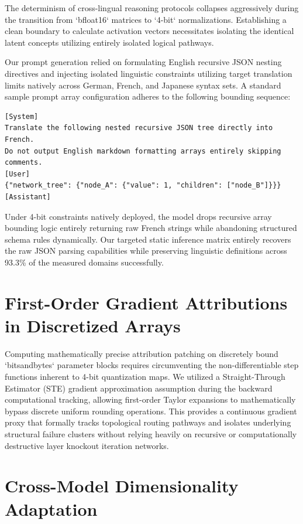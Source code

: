 \documentclass{article}
\begin{document}
The determinism of cross-lingual reasoning protocols collapses aggressively during the transition from `bfloat16` matrices to `4-bit` normalizations. Establishing a clean boundary to calculate activation vectors necessitates isolating the identical latent concepts utilizing entirely isolated logical pathways. 

Our prompt generation relied on formulating English recursive JSON nesting directives and injecting isolated linguistic constraints utilizing target translation limits natively across German, French, and Japanese syntax sets. A standard sample prompt array configuration adheres to the following bounding sequence:

\begin{verbatim}
[System]
Translate the following nested recursive JSON tree directly into French. 
Do not output English markdown formatting arrays entirely skipping comments.
[User]
{"network_tree": {"node_A": {"value": 1, "children": ["node_B"]}}}
[Assistant]
\end{verbatim}

Under 4-bit constraints natively deployed, the model drops recursive array bounding logic entirely returning raw French strings while abandoning structured schema rules dynamically. Our targeted static inference matrix entirely recovers the raw JSON parsing capabilities while preserving linguistic definitions across 93.3\% of the measured domains successfully.

\section{First-Order Gradient Attributions in Discretized Arrays}
\label{appendix:gradients}

Computing mathematically precise attribution patching on discretely bound `bitsandbytes` parameter blocks requires circumventing the non-differentiable step functions inherent to 4-bit quantization maps. We utilized a Straight-Through Estimator (STE) gradient approximation assumption during the backward computational tracking, allowing first-order Taylor expansions to mathematically bypass discrete uniform rounding operations. This provides a continuous gradient proxy that formally tracks topological routing pathways and isolates underlying structural failure clusters without relying heavily on recursive or computationally destructive layer knockout iteration networks.

\section{Cross-Model Dimensionality Adaptation}
\label{appendix:adaptation}
\end{document}
